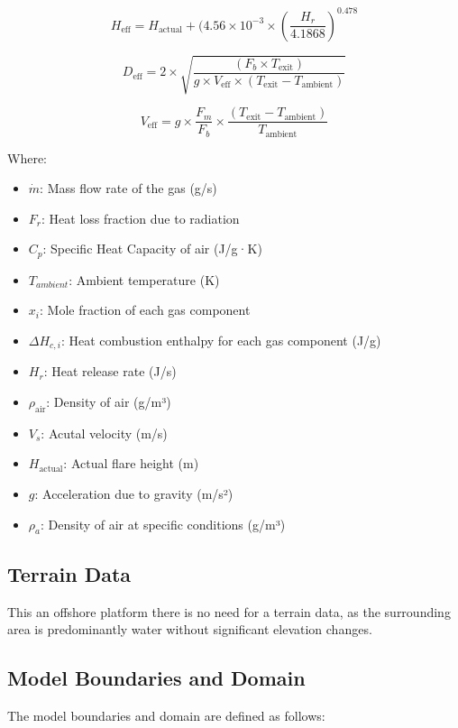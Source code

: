 \begin{equation}
    H_{\text{eff}} = H_{\text{actual}} + (4.56 \times 10^{-3} \times \left( \frac{H_r}{4.1868} \right)^{0.478} 
\end{equation}

\begin{equation}
    D_{\text{eff}} = 2 \times \sqrt{\frac{(F_b \times T_{\text{exit}})}{g \times V_{\text{eff}} \times (T_{\text{exit}} - T_{\text{ambient}})}} 
\end{equation}

\begin{equation}
    V_{\text{eff}} = g \times \frac{F_m}{F_b} \times \frac{(T_{\text{exit}} - T_{\text{ambient}})}{T_{\text{ambient}}} 
\end{equation}



Where:
\begin{itemize}
    \item $\dot{m}$: Mass flow rate of the gas (g/s)
    \item $F_r$: Heat loss fraction due to radiation
    \item $C_p$: Specific Heat Capacity of air (J/g·K)
    \item $T_{ambient}$: Ambient temperature (K)
    \item $x_i$: Mole fraction of each gas component
    \item $\Delta H_{c,i}$: Heat combustion enthalpy for each gas component (J/g)
    \item $H_r$: Heat release rate (J/s)
    \item $\rho_{\text{air}}$: Density of air (g/m³)
    \item $V_s$: Acutal velocity (m/s)
    \item $H_{\text{actual}}$: Actual flare height (m)
    \item $g$: Acceleration due to gravity (m/s²)
    \item $\rho_a$: Density of air at specific conditions (g/m³)
\end{itemize}


\subsection{Terrain Data}
This an offshore platform there is no need for a terrain data, as the surrounding area is predominantly water without significant elevation changes.

\subsection{Model Boundaries and Domain}
The model boundaries and domain are defined as follows:

